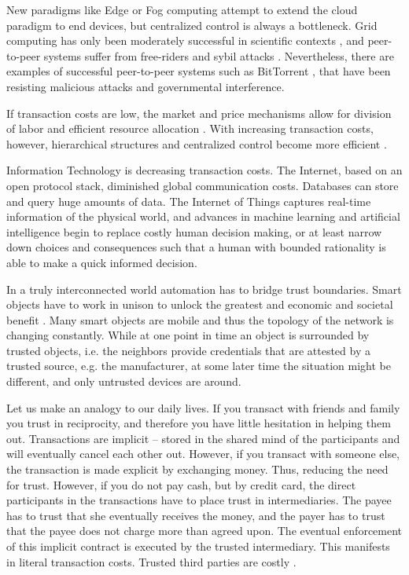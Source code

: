 New paradigms like Edge or Fog computing \parencite{Bonomi:2012:FCR:2342509.2342513,Yi:2015:SFC:2757384.2757397} attempt to extend the cloud paradigm to end devices, but centralized control is always a bottleneck. Grid computing has only been moderately successful in scientific contexts \parencite{Anderson:2002:SEP:581571.581573,Beberg2009Folding}, and peer-to-peer systems \parencite{Rodrigues:2010:PS:1831407.1831427} suffer from free-riders \parencite{10.2307/3003400} and sybil attacks \parencite{douceur2002sybil}. Nevertheless, there are examples of successful peer-to-peer systems such as BitTorrent \parencite{cohen2003incentives}, that have been resisting malicious attacks and governmental interference.

If transaction costs are low, the market and price mechanisms allow for division of labor and efficient resource allocation \parencite{smith1887inquiry}. With increasing transaction costs, however, hierarchical structures and centralized control become more efficient \parencite{ECCA:ECCA386}. 

Information Technology is decreasing transaction costs. The Internet, based on an open protocol stack, diminished global communication costs. Databases can store and query huge amounts of data. The Internet of Things captures real-time information of the physical world, and advances in machine learning and artificial intelligence begin to replace costly human decision making, or at least narrow down choices and consequences such that a human with bounded rationality \parencite{simon1982models} is able to make a quick informed decision. 

In a truly interconnected world automation has to bridge trust boundaries. Smart objects have to work in unison to unlock the greatest and economic and societal benefit \parencite{manyika2015unlocking}.
Many smart objects are mobile and thus the topology of the network is changing constantly. While at one point in time an object is surrounded by trusted objects, i.e. the neighbors provide credentials that are attested by a trusted source, e.g. the manufacturer, at some later time the situation might be different, and only untrusted devices are around. 

Let us make an analogy to our daily lives. If you transact with friends and family you trust in reciprocity, and therefore you have little hesitation in helping them out. Transactions are implicit -- stored in the shared mind of the participants and will eventually cancel each other out. However, if you transact with someone else, the transaction is made explicit by exchanging money. Thus, reducing the need for trust. However, if you do not pay cash, but by credit card, the direct participants in the transactions have to place trust in intermediaries. The payee has to trust that she eventually receives the money, and the payer has to trust that the payee does not charge more than agreed upon. The eventual enforcement of this implicit contract is executed by the trusted intermediary. This manifests in literal transaction costs. Trusted third parties are costly \parencite{szabo2005trusted}.


